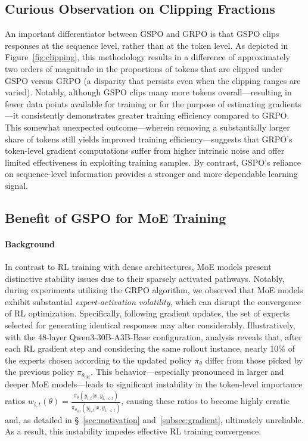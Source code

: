 \subsection{Curious Observation on Clipping Fractions}

An important differentiator between GSPO and GRPO is that GSPO clips responses at the sequence level, rather than at the token level. As depicted in Figure~\ref{fig:clipping}, this methodology results in a difference of approximately two orders of magnitude in the proportions of tokens that are clipped under GSPO versus GRPO (a disparity that persists even when the clipping ranges are varied). Notably, although GSPO clips many more tokens overall—resulting in fewer data points available for training or for the purpose of estimating gradients—it consistently demonstrates greater training efficiency compared to GRPO. This somewhat unexpected outcome—wherein removing a substantially larger share of tokens still yields improved training efficiency—suggests that GRPO’s token-level gradient computations suffer from higher intrinsic noise and offer limited effectiveness in exploiting training samples. By contrast, GSPO’s reliance on sequence-level information provides a stronger and more dependable learning signal.

\subsection{Benefit of GSPO for MoE Training}
\label{subsec:routing_replay}

\paragraph{Background}
In contrast to RL training with dense architectures, MoE models present distinctive stability issues due to their sparsely activated pathways. Notably, during experiments utilizing the GRPO algorithm, we observed that MoE models exhibit substantial \textit{expert-activation volatility}, which can disrupt the convergence of RL optimization. Specifically, following gradient updates, the set of experts selected for generating identical responses may alter considerably. Illustratively, with the 48-layer Qwen3-30B-A3B-Base configuration, analysis reveals that, after each RL gradient step and considering the same rollout instance, nearly 10\% of the experts chosen according to the updated policy $\pi_{\theta}$ differ from those picked by the previous policy $\pi_{\theta_\text{old}}$. This behavior—especially pronounced in larger and deeper MoE models—leads to significant instability in the token-level importance ratios $w_{i,t}(\theta) = \frac{ \pi_{\theta} (y_{i,t} | x, y_{i,<t}) }{ \pi_{\theta_\text{old}} (y_{i,t} | x,y_{i,<t})}$, causing these ratios to become highly erratic and, as detailed in \S~\ref{sec:motivation} and~\ref{subsec:gradient}, ultimately unreliable. As a result, this instability impedes effective RL training convergence.

